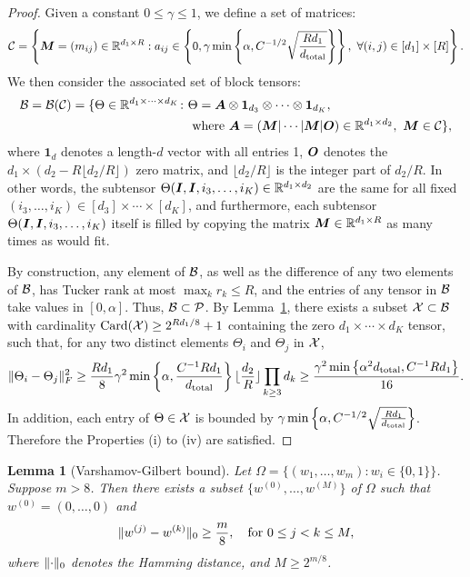 \documentclass[11pt]{article}
\theoremstyle{plain}
\newtheorem{lem}{Lemma}
\theoremstyle{definition}
\begin{document}
\begin{proof}
Given a constant $0\leq \gamma \leq 1$, we define a set of matrices:
\[
\mathcal{C}=\left\{\bm M=(m_{ij})\in\mathbb{R}^{d_1\times R}: a_{ij}\in \left\{ 0,\gamma \min\left\{ \alpha , C^{-1/2}\sqrt{Rd_1\over d_{\text{total}}} \right\}\right\} ,\  \forall (i,j)\in[d_1]\times[R]\right\}.
\]
We then consider the associated set of block tensors:
\begin{align}
\mathcal{B}=\mathcal{B}(\mathcal{C})=\{\Theta\in\mathbb{R}^{d_1\times \cdots \times d_K}\colon& \Theta=\bm A\otimes \mathbf{1}_{d_3}\otimes \cdots \otimes \mathbf{1}_{d_K}, \\
&\ \text{where}\ \bm A=(\bm M|\cdots|\bm M|\bm{O}) \in\mathbb{R}^{d_1\times d_2},\ \bm M\in\mathcal{C}\},
\end{align}
where $\mathbf{1}_d$ denotes a length-$d$ vector with all entries 1, $\bm{O}$ denotes the $d_1\times (d_2-R\lfloor d_2/R \rfloor)$ zero matrix, and $\lfloor d_2/ R \rfloor$ is the integer part of $d_2/R$. In other words, the subtensor $\Theta(\bm I, \bm I,i_3, \ldots,i_K)\in\mathbb{R}^{d_1\times d_2}$ are the same for all fixed $(i_3,\ldots,i_K)\in[d_3]\times \cdots \times [d_K]$, and furthermore, each subtensor $\Theta(\bm I,\bm I, i_3,\ldots,i_K)$ itself is filled by copying the matrix $\bm M\in\mathbb{R}^{d_1\times R}$ as many times as would fit. 

By construction, any element of $\mathcal{B}$, as well as the difference of any two elements of $\mathcal{B}$, has Tucker rank at most $\max_k r_k\leq R$, and the entries of any tensor in $\mathcal{B}$ take values in $[0,\alpha]$. Thus, $\mathcal{B}\subset\mathcal{P}$. By Lemma~\ref{lem:VGbound}, there exists a subset $\mathcal{X}\subset \mathcal{B}$ with cardinality $\text{Card}(\mathcal{X})\geq 2^{Rd_1/8}+1$ containing the zero $d_1\times \cdots \times d_K$ tensor, such that, for any two distinct elements $\Theta_i$ and $\Theta_j$ in $\mathcal{X}$, 
\[
\lVert\Theta_i-\Theta_j\rVert_F^2 \geq {Rd_1\over 8} \gamma^2\min\left\{ \alpha, {C^{-1}Rd_1 \over d_{\text{total}}}\right\} \lfloor {d_2\over R} \rfloor \prod_{k\geq 3}d_k\geq {\gamma^2\min\left\{ \alpha^2 d_{\text{total}}, C^{-1}Rd_1\right\}  \over 16}.
\]
In addition, each entry of $\Theta\in\mathcal{X}$ is bounded by $\gamma \min\left\{ \alpha , C^{-1/2}\sqrt{Rd_1\over d_{\text{total}}}\right\} $. Therefore the Properties (i) to (iv) are satisfied. 
\end{proof}



\begin{lem}[Varshamov-Gilbert bound]\label{lem:VGbound}
Let $\Omega=\{(w_1,\ldots,w_m)\colon w_i\in\{0,1\}\}$. Suppose $m>8$. Then there exists a subset $\{w^{(0)},\ldots,w^{(M)}\}$ of $\Omega$ such that $w^{(0)}=(0,\ldots,0)$ and
\[
\lVert w^{(j)}-w^{(k)}\rVert_0\geq {m\over 8},\quad \text{for} \ 0\leq j<k\leq M,
\]
where $\lVert\cdot\rVert_0$ denotes the Hamming distance, and $M\geq 2^{m/8}$. 
\end{lem}
\end{document}
